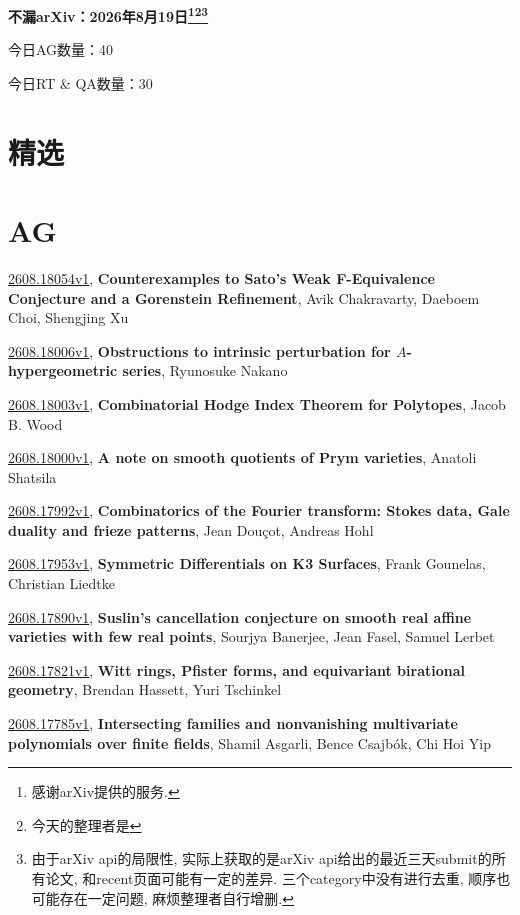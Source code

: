\documentclass[9pt, a4paper]{article}
\theoremstyle{plain}
\theoremstyle{definition}
\theoremstyle{remark}
\newcommand{\arxiv}[3]{\href{https://arxiv.org/abs/#1}{#1}, \textbf{\textcolor{arxivblue}{#2}}, #3}
\newcommand{\AGnumber}{40}
\newcommand{\RTQAnumber}{30}
\newcommand{\NewestDate}{2026年8月19日}
\newcommand{\todayarXiver}{} %
\begin{document}
\begin{center}
    \Huge\textbf{不漏arXiv：\NewestDate\footnote{感谢arXiv提供的服务.}\footnote{今天的整理者是\todayarXiver}\footnote{由于arXiv api的局限性, 实际上获取的是arXiv api给出的最近三天submit的所有论文, 和recent页面可能有一定的差异. 三个category中没有进行去重, 顺序也可能存在一定问题, 麻烦整理者自行增删.}} \\
\end{center}

\setcounter{section}{-1}

\begin{center}
    今日AG数量：\AGnumber
    
    今日RT \& QA数量：\RTQAnumber
    
\end{center}


\section{精选}


\section{AG}
\arxiv{2608.18054v1}{Counterexamples to Sato's Weak F-Equivalence Conjecture and a Gorenstein Refinement}{Avik Chakravarty, Daeboem Choi, Shengjing Xu}

\arxiv{2608.18006v1}{Obstructions to intrinsic perturbation for $A$-hypergeometric series}{Ryunosuke Nakano}

\arxiv{2608.18003v1}{Combinatorial Hodge Index Theorem for Polytopes}{Jacob B. Wood}

\arxiv{2608.18000v1}{A note on smooth quotients of Prym varieties}{Anatoli Shatsila}

\arxiv{2608.17992v1}{Combinatorics of the Fourier transform: Stokes data, Gale duality and frieze patterns}{Jean Douçot, Andreas Hohl}

\arxiv{2608.17953v1}{Symmetric Differentials on K3 Surfaces}{Frank Gounelas, Christian Liedtke}

\arxiv{2608.17890v1}{Suslin's cancellation conjecture on smooth real affine varieties with few real points}{Sourjya Banerjee, Jean Fasel, Samuel Lerbet}

\arxiv{2608.17821v1}{Witt rings, Pfister forms, and equivariant birational geometry}{Brendan Hassett, Yuri Tschinkel}

\arxiv{2608.17785v1}{Intersecting families and nonvanishing multivariate polynomials over finite fields}{Shamil Asgarli, Bence Csajbók, Chi Hoi Yip}
\end{document}
